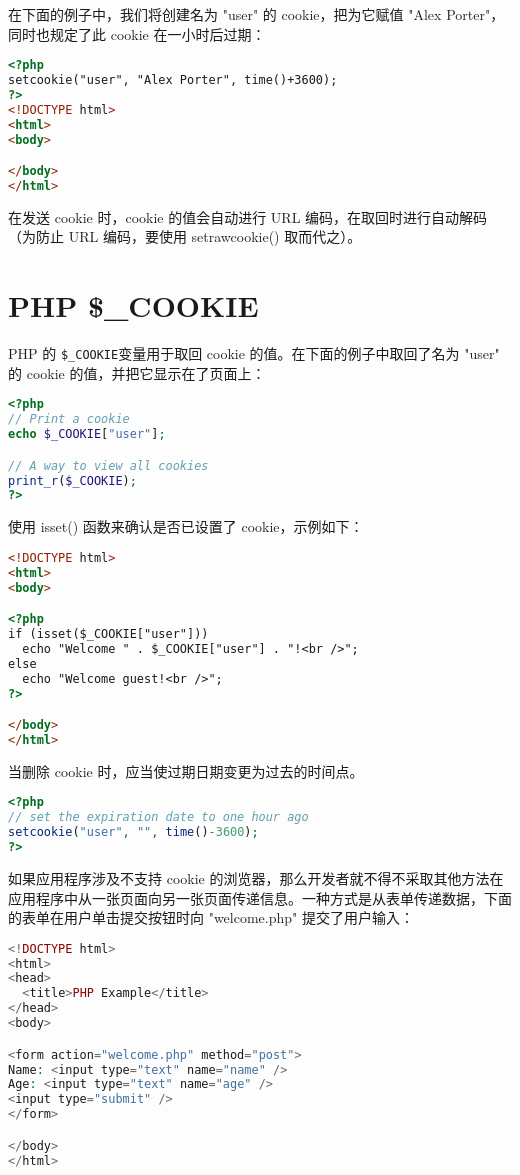在下面的例子中，我们将创建名为 "user" 的 cookie，把为它赋值 "Alex Porter"，同时也规定了此 cookie 在一小时后过期：

\begin{lstlisting}[language=HTML]
<?php 
setcookie("user", "Alex Porter", time()+3600);
?>
<!DOCTYPE html>
<html>
<body>

</body>
</html>
\end{lstlisting}

在发送 cookie 时，cookie 的值会自动进行 URL 编码，在取回时进行自动解码（为防止 URL 编码，要使用 setrawcookie() 取而代之）。


\section{PHP \$\_COOKIE}


PHP 的 \texttt{\$\_COOKIE}变量用于取回 cookie 的值。在下面的例子中取回了名为 "user" 的 cookie 的值，并把它显示在了页面上：

\begin{lstlisting}[language=PHP]
<?php
// Print a cookie
echo $_COOKIE["user"];

// A way to view all cookies
print_r($_COOKIE);
?>
\end{lstlisting}


使用 isset() 函数来确认是否已设置了 cookie，示例如下：


\begin{lstlisting}[language=HTML]
<!DOCTYPE html>
<html>
<body>

<?php
if (isset($_COOKIE["user"]))
  echo "Welcome " . $_COOKIE["user"] . "!<br />";
else
  echo "Welcome guest!<br />";
?>

</body>
</html>
\end{lstlisting}



当删除 cookie 时，应当使过期日期变更为过去的时间点。


\begin{lstlisting}[language=PHP]
<?php 
// set the expiration date to one hour ago
setcookie("user", "", time()-3600);
?>
\end{lstlisting}

如果应用程序涉及不支持 cookie 的浏览器，那么开发者就不得不采取其他方法在应用程序中从一张页面向另一张页面传递信息。一种方式是从表单传递数据，下面的表单在用户单击提交按钮时向 "welcome.php" 提交了用户输入：


\begin{lstlisting}[language=PHP]
<!DOCTYPE html>
<html>
<head>
  <title>PHP Example</title>
</head>
<body>

<form action="welcome.php" method="post">
Name: <input type="text" name="name" />
Age: <input type="text" name="age" />
<input type="submit" />
</form>

</body>
</html>
\end{lstlisting}





